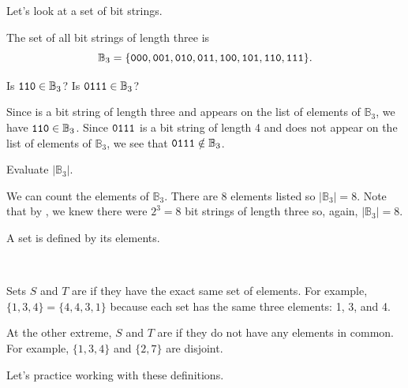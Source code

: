 Let's look at a set of bit strings.

\begin{exam}
\label{exam_set_bs_length3}   
    The set of all bit strings of length three is $$\mathbb{B}_3=\{\texttt{000}, \texttt{001}, \texttt{010}, \texttt{011}, \texttt{100}, \texttt{101}, \texttt{110}, \texttt{111}\}.$$
        \begin{apart}
            \item Is $\texttt{110} \in \mathbb{B}_3$?  Is $\texttt{0111}\in \mathbb{B}_3$?
                \begin{soln}
                    Since  is a bit string of length three and appears on the list of elements of $\mathbb{B}_3$, we have $\texttt{110} \in \mathbb{B}_3$.  Since $\texttt{0111}$ is a bit string of length 4 and does not appear on the list of elements of $\mathbb{B}_3$, we see that $\texttt{0111} \notin \mathbb{B}_3$.
                \end{soln}
            \item Evaluate $|\mathbb{B}_3|$.
                \begin{soln}
                    We can count the elements of $\mathbb{B}_3$. There are 8 elements listed so $|\mathbb{B}_3|=8$.  Note that by , we knew there were $2^3=8$ bit strings of length three so, again, $|\mathbb{B}_3|=8$.
                \end{soln}
        \end{apart}
\end{exam}

A set is defined by its elements.

\begin{defn}
\label{defn_set_equal_disjoint}
~
    \begin{apart}
        \item Sets $S$ and $T$ are  if they have the exact same set of elements.  For example, $\{1,3,4\}=\{4,4,3,1\}$ because each set has the same three elements: 1, 3, and 4.
        \item At the other extreme, $S$ and $T$ are  if they do not have any elements in common. For example, $\{1,3,4\}$ and $\{2,7\}$ are disjoint.
    \end{apart}
\end{defn}

Let's practice working with these definitions.

